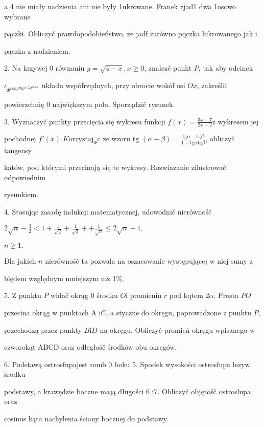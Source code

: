 \documentclass[a4paper,12pt]{article}
\begin{document}
a 4 nie miały nadzienia ani nie były 1ukrowane. Franek zjad1 dwa 1osowo wybrane

pączki. Obliczyč prawdopodobieństwo, $\dot{\mathrm{z}}\mathrm{e}$ jadf zarówno pqczka lukrowanego jak $\mathrm{i}$

pączka $\mathrm{z}$ nadzieniem.

2. Na krzywej $0$ równaniu $y = \sqrt{4-x}, x \geq 0$, znalez$\acute{}$č punkt $P$, tak aby odcinek

$\iota_{\Phi^{\mathrm{c}\mathrm{z}\text{ą} \mathrm{c}\mathrm{y}P\mathrm{z}\mathrm{p}^{\mathrm{O}\mathrm{C}\mathrm{Z}}\Phi^{\mathrm{t}\mathrm{k}\mathrm{i}\mathrm{e}\mathrm{m}}}}$ ukfadu wspófrzędnych, przy obrocie wokóf osi $Ox$, zakreślił

powierzchnię $0$ największym polu. Sporządzič rysunek.

3. Wyznaczyč punkty przecięcia się wykresu funkcji $f(x) = \displaystyle \frac{3x-7}{2x-2} \mathrm{z}$ wykresem jej

pochodnej $f'(x). K\mathrm{o}\mathrm{r}\mathrm{z}\mathrm{y}\mathrm{s}\mathrm{t}\mathrm{a}\mathrm{j}_{\Phi}\mathrm{c}$ ze wzoru tg $(\displaystyle \alpha-\beta)=\frac{\mathrm{t}\mathrm{g}\alpha-\mathrm{t}\mathrm{g}\beta}{1+\mathrm{t}\mathrm{g}\alpha \mathrm{t}\mathrm{g}\beta}$, obliczyč tangensy

katów, pod którymi przecinają się te wykresy. Rozwiazanie zilustrowač odpowiednim

rysunkiem.

4. Stosujqc zasadę indukcji matematycznej, udowodnič nierównośč

$2\displaystyle \sqrt{n}-\frac{3}{2}<1+\frac{1}{\sqrt{2}}+\frac{1}{\sqrt{3}}+ +\displaystyle \frac{1}{\sqrt{n}}\leq 2\sqrt{n}-1,$

$n\geq 1.$

Dla jakich $n$ nierównośč ta pozwala na oszacowanie występującej $\mathrm{w}$ niej sumy $\mathrm{z}$

blędem względnym mniejszym $\mathrm{n}\mathrm{i}\dot{\mathrm{z}}$ 1\%.

5. $\mathrm{Z}$ punktu $P$ widač okrąg $0$ środku $O \mathrm{i}$ promieniu $r$ pod kqtem $ 2\alpha$. Prosta $PO$

przecina okrąg $\mathrm{w}$ punktach A $\mathrm{i}C$, a styczne do okręgu, poprowadzone $\mathrm{z}$ punktu $P,$

przechodzą przez punkty $B\mathrm{i}D$ na okręgu. Obliczyč promień okręgu wpisanego $\mathrm{w}$

czworokąt ABCD oraz odległośč środków obu okręgów.

6. Podstawą ostrosfupajest romb $0$ boku 5. Spodek wysokości ostrosfupa $\mathrm{l}\mathrm{e}\dot{\mathrm{z}}\mathrm{y}\mathrm{w}$ środku

podstawy, a krawędzie boczne mają długości 6 $\mathrm{i}7$. Obliczyč objętośč ostroslupa oraz

cosinus kąta nachylenia ściany bocznej do podstawy.
\end{document}
